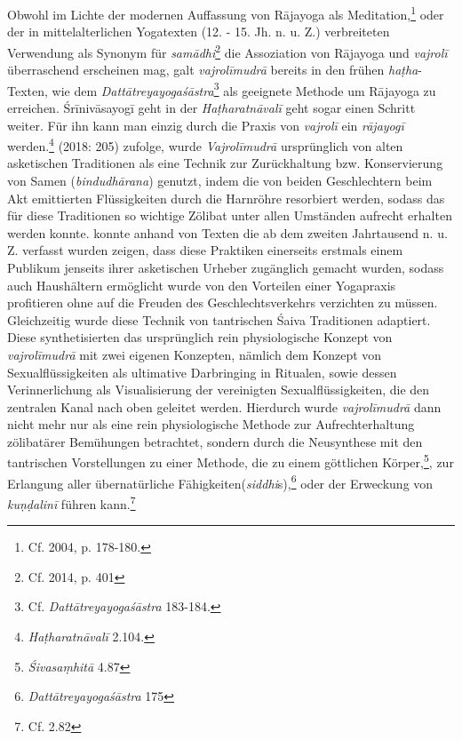 Obwohl im Lichte der modernen Auffassung von Rājayoga als Meditation,\footnote{Cf. \citeauthor{demichelishistory2004} 2004, p. 178-180.} oder der in mittelalterlichen Yogatexten (12. - 15. Jh. n. u. Z.) verbreiteten Verwendung als Synonym für \textit{samādhi}\footnote{Cf. \citeauthor{birch2014} 2014, p. 401} die Assoziation von Rājayoga und \textit{vajrolī} überraschend erscheinen mag, galt \textit{vajrolīmudrā} bereits in den frühen \textit{haṭha}-Texten, wie dem \emph{Dattātreyayogaśāstra}\footnote{Cf. \emph{Dattātreyayogaśāstra} 183-184.} als geeignete Methode um Rājayoga zu erreichen. Śrīnivāsayogī geht in der \emph{Haṭharatnāvalī} geht sogar einen Schritt weiter. Für ihn kann man einzig durch die Praxis von \textit{vajrolī} ein \textit{rājayogī} werden.\footnote{\emph{Haṭharatnāvalī} 2.104.} \citeauthor{mallinson2018vajrolimudra} (2018: 205) zufolge, wurde \textit{Vajrolīmudrā} ursprünglich von alten asketischen Traditionen als eine Technik zur Zurückhaltung bzw. Konservierung von Samen (\textit{bindudhārana}) genutzt, indem die von beiden Geschlechtern beim Akt emittierten Flüssigkeiten durch die Harnröhre resorbiert werden, sodass das für diese Traditionen so wichtige Zölibat unter allen Umständen aufrecht erhalten werden konnte.\citeauthor{mallinson2018vajrolimudra} konnte anhand von Texten die ab dem zweiten Jahrtausend n. u. Z. verfasst wurden zeigen, dass diese Praktiken einerseits erstmals einem Publikum jenseits ihrer asketischen Urheber zugänglich gemacht wurden, sodass auch Haushältern ermöglicht wurde von den Vorteilen einer Yogapraxis profitieren ohne auf die Freuden des Geschlechtsverkehrs verzichten zu müssen. Gleichzeitig wurde diese Technik von tantrischen Śaiva Traditionen adaptiert. Diese synthetisierten das ursprünglich rein physiologische Konzept von \textit{vajrolīmudrā} mit zwei eigenen Konzepten, nämlich dem Konzept von Sexualflüssigkeiten als ultimative Darbringing in Ritualen, sowie dessen Verinnerlichung als Visualisierung der vereinigten Sexualflüssigkeiten, die den zentralen Kanal nach oben geleitet werden. Hierdurch wurde \textit{vajrolīmudrā} dann nicht mehr nur als eine rein physiologische Methode zur Aufrechterhaltung zölibatärer Bemühungen betrachtet, sondern durch die Neusynthese mit den tantrischen Vorstellungen zu einer Methode, die zu einem göttlichen Körper,\footnote{\emph{Śivasaṃhitā} 4.87}, zur Erlangung aller übernatürliche Fähigkeiten(\textit{siddhi}s),\footnote{\emph{Dattātreyayogaśāstra} 175} oder der Erweckung von \textit{kuṇḍalinī} führen kann.\footnote{Cf.  2.82}

